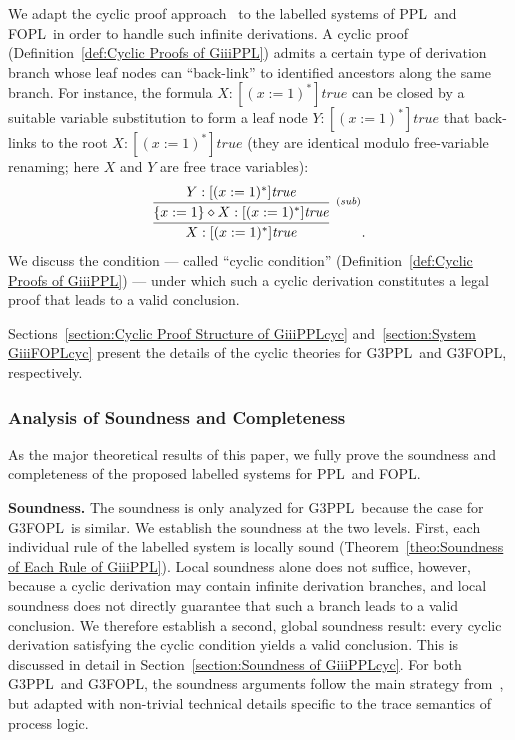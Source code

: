 \documentclass[manuscript,screen]{acmart}
\newcommand{\true}[0]{\mathit{true}}
\newcommand{\Sub}[0]{{\textit{sub}}}
\newcommand{\cat}[0]{\diamond}
\newcommand{\GiiiPPL}[0]{\mbox{G3PPL}}
\newcommand{\GiiiFOPL}[0]{\mbox{G3FOPL}}
\newcommand{\PPL}[0]{\mbox{PPL}}
\newcommand{\FOPL}[0]{\mbox{FOPL}}
\begin{document}
We adapt the cyclic proof approach~\cite{Stirling91,Brotherston07,Brotherston08} to the labelled systems of \PPL\ and \FOPL\ in order to handle such infinite derivations. 
A cyclic proof (Definition~\ref{def:Cyclic Proofs of GiiiPPL}) admits a certain type of derivation branch whose leaf nodes can ``back-link'' to identified ancestors along the same branch. 
For instance, the formula $X : [(x:=1)^*]\true$ can be closed by a suitable variable substitution to form a leaf node $Y : [(x:=1)^*]\true$ that back-links to the root $X : [(x:=1)^*]\true$ (they are identical modulo free-variable renaming; here $X$ and $Y$ are free trace variables): 
$$
\infer[]
{X : [(x:=1)^*]\true}
{
    \infer[^{(\Sub)}]
    {\{x:=1\}\cat X : [(x:=1)^*]\true}
    {
        Y : [(x:=1)^*]\true
    }
}.
$$
We discuss the condition --- called ``cyclic condition'' (Definition~\ref{def:Cyclic Proofs of GiiiPPL}) --- under which such a cyclic derivation constitutes a legal proof that leads to a valid conclusion. 

Sections~\ref{section:Cyclic Proof Structure of GiiiPPLcyc} and~\ref{section:System GiiiFOPLcyc} present the details of the cyclic theories for \GiiiPPL\ and \GiiiFOPL, respectively. 



\subsubsection{Analysis of Soundness and Completeness}
\label{section:Analysis of Soundness and Completeness}

As the major theoretical results of this paper, we fully prove the soundness and completeness of the proposed labelled systems for \PPL\ and \FOPL.

\textbf{Soundness.}  The soundness is only analyzed for \GiiiPPL\ because the case for \GiiiFOPL\ is similar. We establish the soundness at the two levels.  First, each individual rule of the labelled system is locally sound (Theorem~\ref{theo:Soundness of Each Rule of GiiiPPL}).  Local soundness alone does not suffice, however, because a cyclic derivation may contain infinite derivation branches, and local soundness does not directly guarantee that such a branch leads to a valid conclusion.  We therefore establish a second, global soundness result: every cyclic derivation satisfying the cyclic condition yields a valid conclusion.  This is discussed in detail in Section~\ref{section:Soundness of GiiiPPLcyc}.  For both \GiiiPPL\ and \GiiiFOPL, the soundness arguments follow the main strategy from~\cite{zhang2025parameterizeddynamiclogic}, but adapted with non-trivial technical details specific to the trace semantics of process logic.
\end{document}
